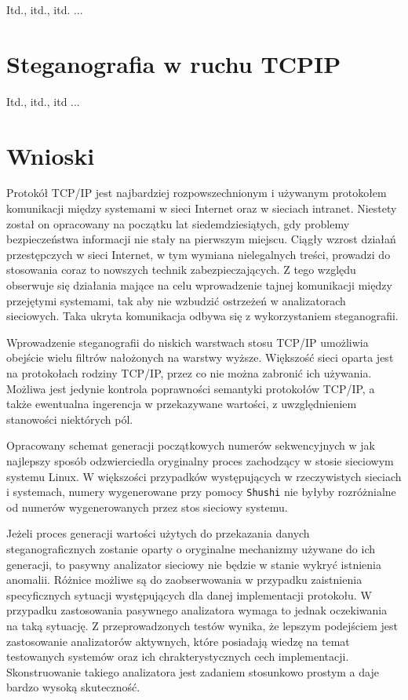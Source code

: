 \documentclass[a4paper,12pt,twoside,openany]{report}
\newcommand{\tech}{\texttt}
\begin{document}
Itd., itd., itd. ...

\chapter{Steganografia w ruchu TCPIP}
\label{chapterSteganografiaWRuchuTCPIP}

Itd., itd., itd ...

\chapter{Wnioski}

Protokół TCP/IP jest najbardziej rozpowszechnionym i używanym protokołem komunikacji między systemami w sieci Internet oraz w sieciach intranet. Niestety został on opracowany na początku lat siedemdziesiątych, gdy problemy bezpieczeństwa informacji nie stały na pierwszym miejscu. Ciągły wzrost działań przestępczych w sieci Internet, w tym wymiana nielegalnych treści, prowadzi do stosowania coraz to nowszych technik zabezpieczających. Z tego względu obserwuje się działania mające na celu wprowadzenie tajnej komunikacji między przejętymi systemami, tak aby nie wzbudzić ostrzeżeń w analizatorach sieciowych. Taka ukryta komunikacja odbywa się z wykorzystaniem steganografii.

Wprowadzenie steganografii do niskich warstwach stosu TCP/IP umożliwia obejście wielu filtrów nałożonych na warstwy wyższe. Większość sieci oparta jest na protokołach rodziny TCP/IP, przez co nie można zabronić ich używania. Możliwa jest jedynie kontrola poprawności semantyki protokołów TCP/IP, a także ewentualna ingerencja w przekazywane wartości, z uwzględnieniem stanowości niektórych pól.

Opracowany schemat generacji początkowych numerów sekwencyjnych w jak najlepszy sposób odzwierciedla oryginalny proces zachodzący w stosie sieciowym systemu Linux. W większości przypadków występujących w rzeczywistych sieciach i systemach, numery wygenerowane przy pomocy \tech{Shushi} nie byłyby rozróżnialne od numerów wygenerowanych przez stos sieciowy systemu.

Jeżeli proces generacji wartości użytych do przekazania danych steganograficznych zostanie oparty o oryginalne mechanizmy używane do ich generacji, to pasywny analizator sieciowy nie będzie w stanie wykryć istnienia anomalii. Różnice możliwe są do zaobserwowania w przypadku zaistnienia specyficznych sytuacji występujących dla danej implementacji protokołu. W przypadku zastosowania pasywnego analizatora wymaga to jednak oczekiwania na taką sytuację. Z przeprowadzonych testów wynika, że lepszym podejściem jest zastosowanie analizatorów aktywnych, które posiadają wiedzę na temat testowanych systemów oraz ich chrakterystycznych cech implementacji. Skonstruowanie takiego analizatora jest zadaniem stosunkowo prostym a daje bardzo wysoką skuteczność.
\end{document}
